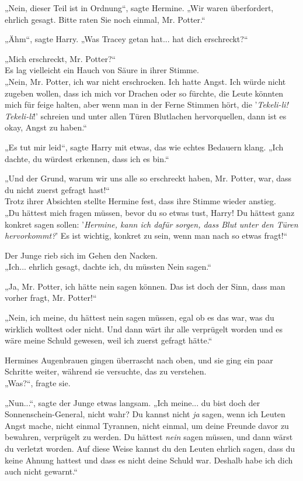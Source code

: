 {„Nein, dieser Teil ist in Ordnung“, sagte Hermine. „Wir waren überfordert, ehrlich gesagt. Bitte raten Sie noch einmal, Mr. Potter.“

„Ähm“, sagte Harry. „Was Tracey getan hat... hat dich erschreckt?“

„Mich erschreckt, Mr. Potter?“\\ Es lag vielleicht ein Hauch von Säure in ihrer Stimme.\\ „Nein, Mr. Potter, ich war nicht erschrocken. Ich hatte Angst. Ich würde nicht zugeben wollen, dass ich mich vor Drachen oder so fürchte, die Leute könnten mich für feige halten, aber wenn man in der Ferne Stimmen hört, die '\emph{Tekeli-li! Tekeli-li}!' schreien und unter allen Türen Blutlachen hervorquellen, dann ist es okay, Angst zu haben.“

„Es tut mir leid“, sagte Harry mit etwas, das wie echtes Bedauern klang. „Ich dachte, du würdest erkennen, dass ich es bin.“

„Und der Grund, warum wir uns alle so erschreckt haben, Mr. Potter, war, dass du nicht zuerst gefragt hast!“\\ Trotz ihrer Absichten stellte Hermine fest, dass ihre Stimme wieder anstieg.\\ „Du hättest mich fragen müssen, bevor du so etwas tust, Harry! Du hättest ganz konkret sagen sollen: '\emph{Hermine, kann ich dafür sorgen, dass Blut unter den Türen hervorkommt?}' Es ist wichtig, konkret zu sein, wenn man nach so etwas fragt!“

Der Junge rieb sich im Gehen den Nacken.\\ „Ich... ehrlich gesagt, dachte ich, du müssten Nein sagen.“

„Ja, Mr. Potter, ich hätte nein sagen können. Das ist doch der Sinn, dass man vorher fragt, Mr. Potter!“

„Nein, ich meine, du hättest nein sagen müssen, egal ob es das war, was du wirklich wolltest oder nicht. Und dann wärt ihr alle verprügelt worden und es wäre meine Schuld gewesen, weil ich zuerst gefragt hätte.“

Hermines Augenbrauen gingen überrascht nach oben, und sie ging ein paar Schritte weiter, während sie versuchte, das zu verstehen.\\ „Was?“, fragte sie.

„Nun...“, sagte der Junge etwas langsam. „Ich meine... du bist doch der Sonnenschein-General, nicht wahr? Du kannst nicht \emph{ja} sagen, wenn ich Leuten Angst mache, nicht einmal Tyrannen, nicht einmal, um deine Freunde davor zu bewahren, verprügelt zu werden. Du hättest \emph{nein} sagen müssen, und dann wärst du verletzt worden. Auf diese Weise kannst du den Leuten ehrlich sagen, dass du keine Ahnung hattest und dass es nicht deine Schuld war. Deshalb habe ich dich auch nicht gewarnt.“

}
